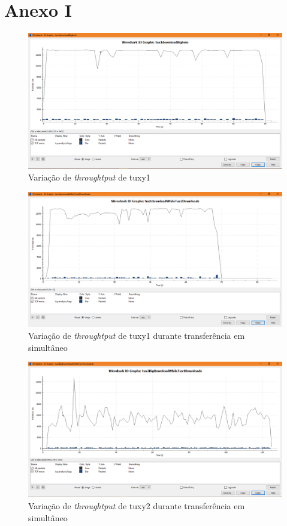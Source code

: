 \documentclass[a4paper, 11pt]{article}
\begin{document}
\section{Anexo I}
\begin{figure}[h]
\centering
\includegraphics[scale=0.4]{images/tux1_solo_stats.PNG}
\caption{Variação de \textit{throughtput} de tuxy1}
\label{Momentanpol}
\end{figure}
\begin{figure}[h]
\centering
\includegraphics[scale=0.4]{images/tux1_while_tux2_stats.PNG}
\caption{Variação de \textit{throughtput} de tuxy1 durante transferência em simultâneo}
\label{Momentanpol}
\end{figure}
\begin{figure}[h]
\centering
\includegraphics[scale=0.4]{images/tux2_while_tux1_stats.PNG}
\caption{Variação de \textit{throughtput} de tuxy2 durante transferência em simultâneo}
\label{Momentanpol}
\end{figure}
\end{document}
